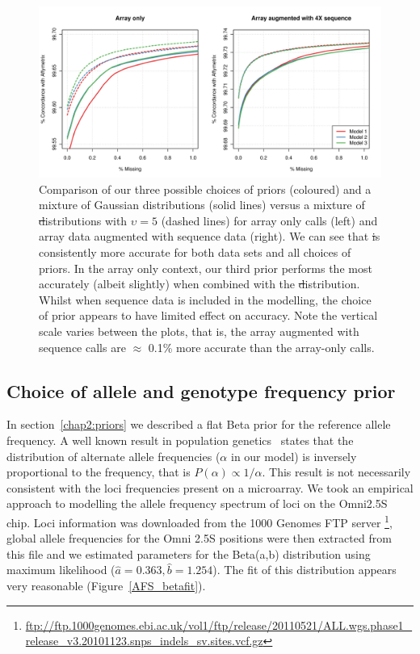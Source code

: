 \begin{figure}[h]
  \begin{center} 
    \includegraphics[width=\textwidth]{chap2figs/SupFig4}
    \caption[Evaluation of prior choices for centroids]{Comparison of our three possible choices of priors (coloured) and a mixture of Gaussian distributions (solid lines) versus a mixture of \st distributions with $\upsilon=5$ (dashed lines) for array only calls (left) and array data augmented with sequence data (right).  We can see that \st is consistently more accurate for both data sets and all choices of priors.  In the array only context, our third prior performs the most accurately (albeit slightly) when combined with the \st distribution.  Whilst when sequence data is included in the modelling, the choice of prior appears to have limited effect on accuracy.  Note the vertical scale varies between the plots, that is, the array augmented with sequence calls are $\approx$ 0.1\% more accurate than the array-only calls.\label{priorcompare}}
  \end{center} 
\end{figure}


\subsection*{Choice of allele and genotype frequency prior} \label{freqprior}
\label{chap2:results:exploratory:freq}
In section~\ref{chap2:priors} we described a flat Beta prior for the reference allele frequency. A well known result in population genetics~\citep{fu1995statistical} states that the distribution of alternate allele frequencies ($\alpha$ in our model) is inversely proportional to the frequency, that is $P(\alpha) \propto 1/\alpha$.  This result is not necessarily consistent with the loci frequencies present on a microarray.  We took an empirical approach to modelling the allele frequency spectrum of loci on the Omni2.5S chip. Loci information was downloaded from the 1000 Genomes FTP server \footnote{\url{ftp://ftp.1000genomes.ebi.ac.uk/vol1/ftp/release/20110521/ALL.wgs.phase1_release_v3.20101123.snps_indels_sv.sites.vcf.gz}}, global allele frequencies for the Omni 2.5S positions were then extracted from this file and we estimated parameters for the Beta(a,b) distribution using maximum likelihood ($\hat{a}=0.363,\hat{b}=1.254$).  The fit of this distribution appears very reasonable (Figure~\ref{AFS_betafit}).


